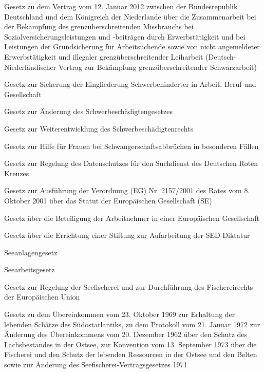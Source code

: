 \item[{SchwarzArbVtrG-NLD}] Gesetz zu dem Vertrag vom 12. Januar 2012 zwischen der Bundesrepublik Deutschland und dem Königreich der Niederlande über die Zusammenarbeit bei der Bekämpfung des grenzüberschreitenden Missbrauchs bei Sozialversicherungsleistungen und -beiträgen durch Erwerbstätigkeit und bei Leistungen der Grundsicherung für Arbeitsuchende sowie von nicht angemeldeter Erwerbstätigkeit und illegaler grenzüberschreitender Leiharbeit (Deutsch-Niederländischer Vertrag zur Bekämpfung grenzüberschreitender Schwarzarbeit)

\item[{SchwbG}] Gesetz zur Sicherung der Eingliederung Schwerbehinderter in Arbeit, Beruf und Gesellschaft

\item[{SchwbGÄndG}] Gesetz zur Änderung des Schwerbeschädigtengesetzes

\item[{SchwbWG}] Gesetz zur Weiterentwicklung des Schwerbeschädigtenrechts

\item[{SchwHG}] Gesetz zur Hilfe für Frauen bei Schwangerschaftsabbrüchen in besonderen Fällen

\item[{SDDSG}] Gesetz zur Regelung des Datenschutzes für den Suchdienst des Deutschen Roten Kreuzes

\item[{SEAG}] Gesetz zur Ausführung der Verordnung (EG) Nr. 2157/2001 des Rates vom 8. Oktober 2001 über das Statut der Europäischen Gesellschaft (SE)

\item[{SEBG}] Gesetz über die Beteiligung der Arbeitnehmer in einer Europäischen Gesellschaft

\item[{SEDDiktStiftG}] Gesetz über die Errichtung einer Stiftung zur Aufarbeitung der SED-Diktatur

\item[{SeeAnlG}] Seeanlagengesetz

\item[{SeeArbG}] Seearbeitsgesetz

\item[{SeeFischG}] Gesetz zur Regelung der Seefischerei und zur Durchführung des Fischereirechts der Europäischen Union

\item[{SeeFischVtrG-1976}] Gesetz zu dem Übereinkommen vom 23. Oktober 1969 zur Erhaltung der lebenden Schätze des Südostatlantiks, zu dem Protokoll vom 21. Januar 1972 zur Änderung des Übereinkommens vom 20. Dezember 1962 über den Schutz des Lachsbestandes in der Ostsee, zur Konvention vom 13. September 1973 über die Fischerei und den Schutz der lebenden Ressourcen in der Ostsee und den Belten sowie zur Änderung des Seefischerei-Vertragsgesetzes 1971

